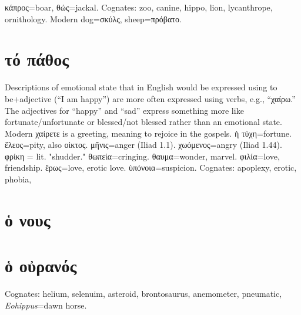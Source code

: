 \documentclass[12pt,openany]{book}
\newenvironment{notes}{\vfill\scriptsize\begin{flushright}}{\end{flushright}}
\newcommand{\fig}[1]{\begin{center}\end{center}}
\begin{document}
\fig{animals/animals.svg} %

\begin{notes}
κάπρος=boar,  θώς=jackal. Cognates: zoo, canine, hippo, lion, lycanthrope, ornithology.
Modern dog=σκύλς, sheep=πρόβατο.
\end{notes}


\chapter{τό πάθος}

\fig{emotions/emotions.svg}

\begin{notes}
Descriptions of emotional state that in English would be expressed using to be+adjective (``I am happy'') are
more often expressed using verbs, e.g., ``χαίρω.'' The adjectives for ``happy'' and ``sad'' express something
more like fortunate/unfortunate or blessed/not blessed rather than an emotional state.
Modern χαίρετε is a greeting, meaning to rejoice in the gospels.
ἡ τύχη=fortune. ἕλεος=pity, also οἱκτος. μῆνις=anger (Iliad 1.1). χωόμενος=angry (Iliad 1.44). φρίκη = lit. "shudder."
θωπεία=cringing. θαυμα=wonder, marvel. φιλία=love, friendship. ἕρως=love, erotic love. ὑπόνοια=suspicion.
Cognates: apoplexy, erotic, phobia, 
\end{notes}


\chapter{ὁ νους}

\fig{mind/mind.svg}


\chapter{ὁ οὐρανός}

\fig{sky/sky.svg}

\begin{notes}
Cognates: helium, selenuim, asteroid, brontosaurus, anemometer, pneumatic, \emph{Eohippus}=dawn horse.
\end{notes}
\end{document}
